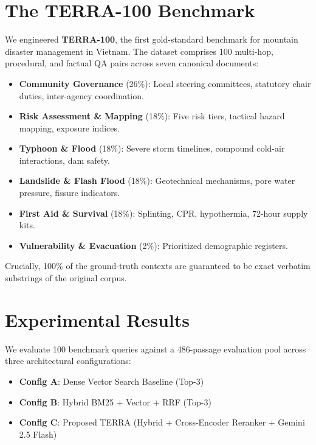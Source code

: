 \documentclass[conference]{IEEEtran}
\begin{document}
\section{The TERRA-100 Benchmark}
We engineered \textbf{TERRA-100}, the first gold-standard benchmark for mountain disaster management in Vietnam. The dataset comprises 100 multi-hop, procedural, and factual QA pairs across seven canonical documents:
\begin{itemize}
    \item \textbf{Community Governance} (26\%): Local steering committees, statutory chair duties, inter-agency coordination.
    \item \textbf{Risk Assessment \& Mapping} (18\%): Five risk tiers, tactical hazard mapping, exposure indices.
    \item \textbf{Typhoon \& Flood} (18\%): Severe storm timelines, compound cold-air interactions, dam safety.
    \item \textbf{Landslide \& Flash Flood} (18\%): Geotechnical mechanisms, pore water pressure, fissure indicators.
    \item \textbf{First Aid \& Survival} (18\%): Splinting, CPR, hypothermia, 72-hour supply kits.
    \item \textbf{Vulnerability \& Evacuation} (2\%): Prioritized demographic registers.
\end{itemize}
Crucially, 100\% of the ground-truth contexts are guaranteed to be exact verbatim substrings of the original corpus.

\section{Experimental Results}
We evaluate 100 benchmark queries against a 486-passage evaluation pool across three architectural configurations:
\begin{itemize}
    \item \textbf{Config A}: Dense Vector Search Baseline (Top-3)
    \item \textbf{Config B}: Hybrid BM25 + Vector + RRF (Top-3)
    \item \textbf{Config C}: Proposed TERRA (Hybrid + Cross-Encoder Reranker + Gemini 2.5 Flash)
\end{itemize}
\end{document}

